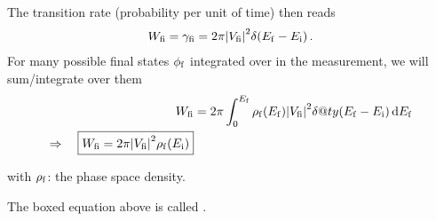 The transition rate (probability per unit of time) then reads
\begin{align}
    W_{\mathrm{fi}} = \gamma_{\mathrm{fi}} = 2 \pi \qty|V_{\mathrm{fi}}|^2 \delta \qty(E_{\mathrm{f}} - E_{\mathrm{i}})\,.
\end{align}
For many possible final states $\phi_{\mathrm{f}}$ integrated over in the measurement, we will sum/integrate over them
\begin{align}\begin{split}
    W_{\mathrm{fi}} & = 2\pi \int_0^{E_{\mathrm{f}}} \rho_{\mathrm{f}} \qty(E_{\mathrm{f}}) \qty|V_{\mathrm{fi}}|^2 \delta @ty(E_{\mathrm{f}} - E_{\mathrm{i}}) \dd{E_{\mathrm{f}}}\\
    \Rightarrow\quad \boxed{ W_{\mathrm{fi}} = 2\pi \qty|V_{\mathrm{fi}}|^2 \rho_{\mathrm{f}} \qty(E_{\mathrm{i}})}
\end{split}\end{align}
\begin{compactitem}
    \item[with] $\rho_{\mathrm{f}}$: the phase space density.
\end{compactitem}
The boxed equation above is called .



